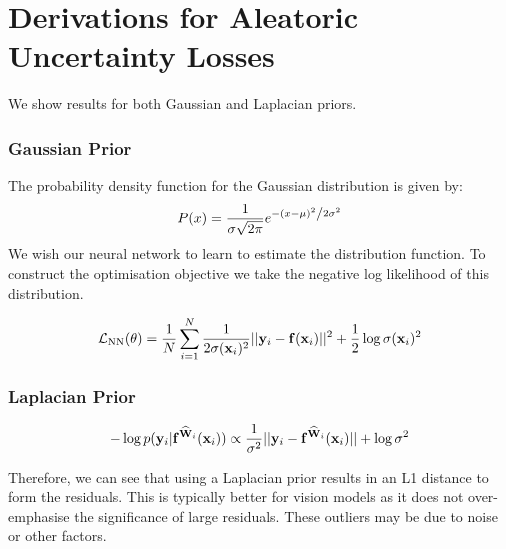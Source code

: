 \chapter{Derivations for Aleatoric Uncertainty Losses}

We show results for both Gaussian and Laplacian priors.

\subsection{Gaussian Prior}

The probability density function for the Gaussian distribution is given by:
\begin{equation}
P(x) = \frac{1}{{\sigma \sqrt {2\pi } }}e^{{{ - \left( {x - \mu } \right)^2 } \mathord{\left/ {\vphantom {{ - \left( {x - \mu } \right)^2 } {2\sigma ^2 }}} \right. \kern-\nulldelimiterspace} {2\sigma ^2 }}}
\end{equation}
We wish our neural network to learn to estimate the distribution function. To construct the optimisation objective we take the negative log likelihood of this distribution.

\begin{equation}
\mathcal{L}_\text{NN}(\theta) = \frac{1}{N} \sum_{i=1}^N \frac{1}{2\sigma(\mathbf{x}_i)^2} ||\mathbf{y}_i - \mathbf{f}(\mathbf{x}_i)||^2 + \frac{1}{2} \log \sigma(\mathbf{x}_i)^2
\end{equation}


\subsection{Laplacian Prior}

\begin{equation}
-\log p(\mathbf{y}_i | \mathbf{f}^{{\widehat{\mathbf{W}}}_i}(\mathbf{x}_i)) \propto \frac{1}{\sigma^2}||\mathbf{y}_i - \mathbf{f}^{{\widehat{\mathbf{W}}}_i}(\mathbf{x}_i)|| + \log \sigma^2 
\end{equation}

Therefore, we can see that using a Laplacian prior results in an L1 distance to form the residuals. This is typically better for vision models as it does not over-emphasise the significance of large residuals. These outliers may be due to noise or other factors.

